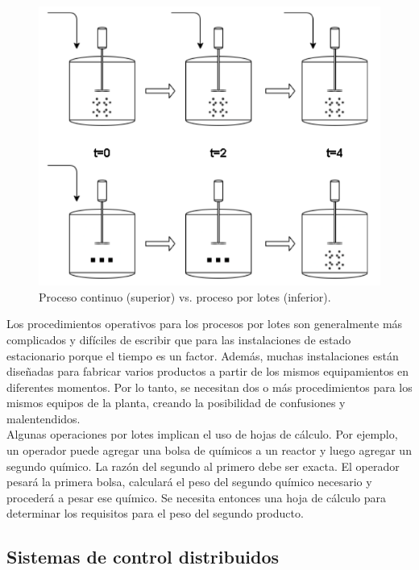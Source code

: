 \begin{figure}[htpb]
	\centering
	\includegraphics[scale=.45]{./Figures/tanks.png}
	\caption{Proceso continuo (superior) vs. proceso por lotes (inferior)\protect\footnotemark.}
	\label{fig:tanks}
\end{figure}

Los procedimientos operativos para los procesos por lotes son generalmente más complicados y difíciles de escribir que para las instalaciones de estado estacionario porque el tiempo es un factor. Además, muchas instalaciones están diseñadas para fabricar varios productos a partir de los mismos equipamientos en diferentes momentos. Por lo tanto, se necesitan dos o más procedimientos para los mismos equipos de la planta, creando la posibilidad de confusiones y malentendidos.\\

Algunas operaciones por lotes implican el uso de hojas de cálculo. Por ejemplo, un operador puede agregar una bolsa de químicos a un reactor y luego agregar un segundo químico. La razón del segundo al primero debe ser exacta. El operador pesará la primera bolsa, calculará el peso del segundo químico necesario y procederá a pesar ese químico. Se necesita entonces una hoja de cálculo para determinar los requisitos para el peso del segundo producto.

\subsection{Sistemas de control distribuidos}

